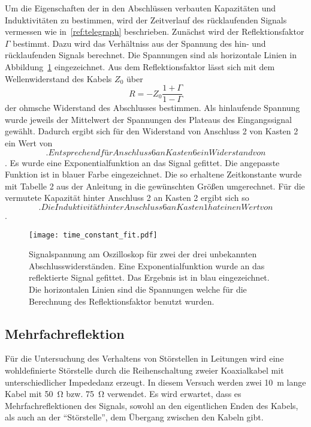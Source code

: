 Um die Eigenschaften der in den Abschlüssen verbauten Kapazitäten und Induktivitäten zu bestimmen,
wird der Zeitverlauf des rücklaufenden Signals vermessen wie in~\ref{ref:telegraph} beschrieben. Zunächst wird der Reflektionsfaktor $\Gamma$ bestimmt.
Dazu wird das Verhältniss aus der Spannung des hin- und rücklaufenden Signals berechnet. Die Spannungen sind als horizontale Linien in
Abbildung~\ref{fig:fit} eingezeichnet. Aus dem Reflektionsfaktor lässt sich mit dem Wellenwiderstand des Kabels $Z_0$ über
\begin{equation}
  R = - Z_0 \frac{ 1 + \Gamma}{ 1 - \Gamma}
\end{equation}
der ohmsche Widerstand des Abschlusses bestimmen.
Als hinlaufende Spannung wurde jeweils der Mittelwert der Spannungen des Plateaus des Eingangssignal gewählt. Dadurch ergibt sich
für den Widerstand von Anschluss 2 von Kasten 2 ein Wert von $$. Entsprechend für Anschluss 6 an Kasten 6 ein Widerstand
von $$.
Es wurde eine Exponentialfunktion an das Signal gefittet. Die angepasste Funktion ist in blauer Farbe eingezeichnet.
Die so erhaltene Zeitkonstante wurde mit Tabelle 2 aus der Anleitung in die gewünschten Größen umgerechnet.
Für die vermutete Kapazität hinter Anschluss 2 an Kasten 2 ergibt sich so $$.
Die Induktivität hinter Anschluss 6 an Kasten 1 hat einen Wert von $$.

\begin{figure}
  \centering
  \texttt{[image: time\_constant\_fit.pdf]}
  \caption{%
    Signalspannung am Oszilloskop für zwei der drei unbekannten Abschlusswiderständen. Eine Exponentialfunktion wurde an das reflektierte Signal
    gefittet. Das Ergebnis ist in blau eingezeichnet. Die horizontalen Linien sind die Spannungen welche für die Berechnung des Reflektionsfaktor
    benutzt wurden.
  }\label{fig:fit}
\end{figure}
\subsection{Mehrfachreflektion}

Für die Untersuchung des Verhaltens von Störstellen in Leitungen wird eine wohldefinierte
Störstelle durch die Reihenschaltung zweier Koaxialkabel mit unterschiedlicher Impededanz
erzeugt.
In diesem Versuch werden zwei \SI{10}{\meter} lange Kabel mit \SI{50}{\ohm} bzw. \SI{75}{\ohm} verwendet.
Es wird erwartet, dass es Mehrfachreflektionen des Signals, sowohl an den eigentlichen Enden
des Kabels, als auch an der \enquote{Störstelle}, dem Übergang zwischen den Kabeln gibt.

